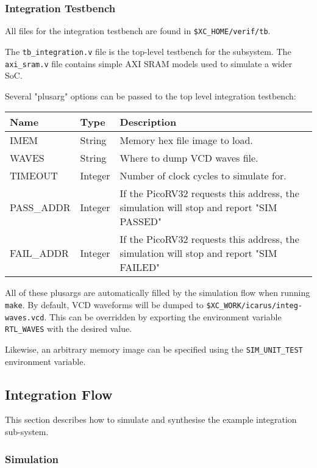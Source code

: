 \subsubsection{Integration Testbench}

All files for the integration testbench are found in 
{\tt \$XC\_HOME/verif/tb}.

The {\tt tb\_integration.v} file is the top-level testbench for the 
subsystem.
The {\tt axi\_sram.v} file contains simple AXI SRAM models used to simulate
a wider SoC.

Several "plusarg" options can be passed to the top level integration
testbench:

\begin{table}[h]
\begin{tabularx}{\textwidth}{l l Y}
\toprule
\textbf{Name} & \textbf{Type} & \textbf{Description} \\ \midrule
  IMEM        & String        & Memory hex file image to load. \\
  WAVES       & String        & Where to dump VCD waves file.  \\
  TIMEOUT     & Integer       & Number of clock cycles to simulate for. \\
  PASS\_ADDR  & Integer       & If the PicoRV32 requests this address, the 
    simulation will stop and report "SIM PASSED"    \\
  FAIL\_ADDR  & Integer       & If the PicoRV32 requests this address, the
    simulation will stop and report "SIM FAILED" \\
\bottomrule
\end{tabularx}
\end{table}

All of these plusargs are automatically filled by the simulation flow
when running {\tt make}.
By default, VCD waveforms will be dumped to
{\tt \$XC\_WORK/icarus/integ-waves.vcd}.
This can be overridden by exporting the environment variable
{\tt RTL\_WAVES} with the desired value.

Likewise, an arbitrary memory image can be specified using the
{\tt SIM\_UNIT\_TEST} environment variable.


\subsection{Integration Flow}

This section describes how to simulate and synthesise the example
integration sub-system.

\subsubsection{Simulation}

